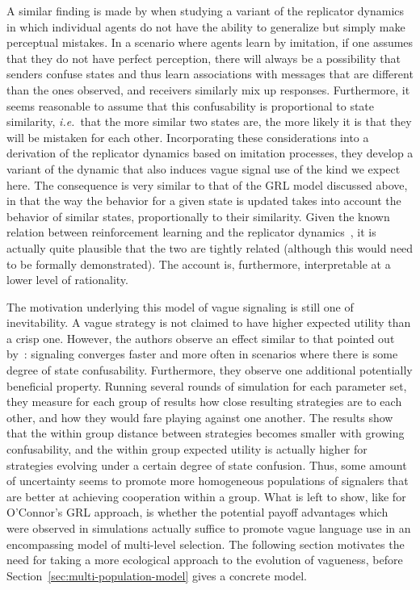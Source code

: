 \documentclass[a4paper]{article}
\begin{document}
A similar finding is made by \textcite{franke_vagueness_2017} when studying a variant of the replicator dynamics in which individual agents do not have the ability to generalize but simply make perceptual mistakes. 
In a scenario where agents learn by imitation, if one assumes that they do not have perfect perception, there will always be a possibility that senders confuse states and thus learn associations with messages that are different than the ones observed, and receivers similarly mix up responses.
Furthermore, it seems reasonable to assume that this confusability is proportional to state similarity, \emph{i.e.}~that the more similar two states are, the more likely it is that they will be mistaken for each other.
Incorporating these considerations into a derivation of the replicator dynamics based on imitation processes, they develop a variant of the dynamic that also induces vague signal use of the kind we expect here.
The consequence is very similar to that of the GRL model discussed above, in that the way the behavior for a given state is updated takes into account the behavior of similar states, proportionally to their similarity.
Given the known relation between reinforcement learning and the replicator dynamics~\parencite{Beggs2005}, it is actually quite plausible that the two are tightly related (although this would need to be formally demonstrated).
The account is, furthermore, interpretable at a lower level of rationality.

The motivation underlying this model of vague signaling is still one of inevitability.
A vague strategy is not claimed to have higher expected utility than a crisp one.
However, the authors observe an effect similar to that pointed out by~\citeauthor{oconnor_evolution_2014}: signaling converges faster and more often in scenarios where there is some degree of state confusability.
Furthermore, they observe one additional potentially beneficial property.
Running several rounds of simulation for each parameter set, they measure for each group of results how close resulting strategies are to each other, and how they would fare playing against one another.
The results show that the within group distance between strategies becomes smaller with growing confusability, and the within group expected utility is actually higher for strategies evolving under a certain degree of state confusion.
Thus, some amount of uncertainty seems to promote more homogeneous populations of signalers that are better at achieving cooperation within a group.
What is left to show, like for O'Connor's GRL approach, is whether the potential payoff advantages which were observed in simulations actually suffice to promote vague language use in an encompassing model of multi-level selection.
The following section motivates the need for taking a more ecological approach to the evolution of vagueness, before Section~\ref{sec:multi-population-model} gives a concrete model.
\end{document}
